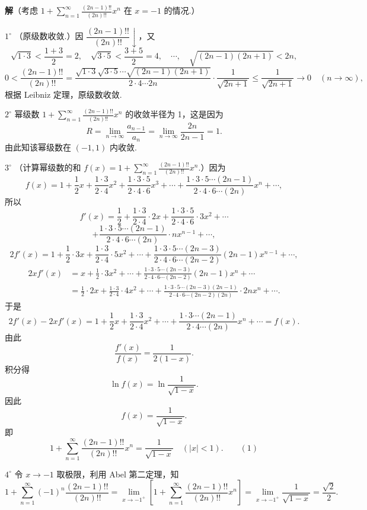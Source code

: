 \documentclass[UTF8, 12pt, fontset=fandol, oneside]{ctexart}
\begin{document}
\noindent\textbf{解}\quad （考虑 $\displaystyle 1+\sum_{n=1}^{\infty}\frac{(2n-1)!!}{(2n)!!}x^n$ 在 $x=-1$ 的情况.）

$1^\circ$ （原级数收敛.）因 $\dfrac{(2n-1)!!}{(2n)!!}\downarrow$，又
\[
  \sqrt{1\cdot3}<\frac{1+3}{2}=2,\quad
  \sqrt{3\cdot5}<\frac{3+5}{2}=4,\quad\cdots,\quad
  \sqrt{(2n-1)(2n+1)}<2n,
\]
\[
  0<\frac{(2n-1)!!}{(2n)!!}
  =\frac{\sqrt{1\cdot3}\sqrt{3\cdot5}\cdots\sqrt{(2n-1)(2n+1)}}{2\cdot4\cdots2n}\cdot\frac1{\sqrt{2n+1}}
  \le\frac1{\sqrt{2n+1}}\to0\quad(n\to\infty),
\]
根据 Leibniz 定理，原级数收敛.

$2^\circ$ 幂级数 $\displaystyle 1+\sum_{n=1}^{\infty}\frac{(2n-1)!!}{(2n)!!}x^n$ 的收敛半径为 1，这是因为
\[
  R=\lim_{n\to\infty}\frac{a_{n-1}}{a_n}
  =\lim_{n\to\infty}\frac{2n}{2n-1}=1.
\]
由此知该幂级数在 $(-1,1)$ 内收敛.

$3^\circ$ （计算幂级数的和
$\displaystyle f(x)=1+\sum_{n=1}^{\infty}\frac{(2n-1)!!}{(2n)!!}x^n$.）因为
\[
  f(x)=1+\frac12x+\frac{1\cdot3}{2\cdot4}x^2
  +\frac{1\cdot3\cdot5}{2\cdot4\cdot6}x^3+\cdots
  +\frac{1\cdot3\cdot5\cdots(2n-1)}{2\cdot4\cdot6\cdots(2n)}x^n+\cdots,
\]
所以
\[
  f'(x)=\frac12+\frac{1\cdot3}{2\cdot4}\cdot2x
  +\frac{1\cdot3\cdot5}{2\cdot4\cdot6}\cdot3x^2+\cdots
\]
\[
  +\frac{1\cdot3\cdot5\cdots(2n-1)}{2\cdot4\cdot6\cdots(2n)}\cdot nx^{n-1}+\cdots,
\]
\[
  2f'(x)=1+\frac12\cdot3x+\frac{1\cdot3}{2\cdot4}\cdot5x^2+\cdots
  +\frac{1\cdot3\cdot5\cdots(2n-3)}{2\cdot4\cdot6\cdots(2n-2)}(2n-1)x^{n-1}+\cdots,
\]
\[
\begin{aligned}
2xf'(x)&=x+\frac12\cdot3x^2+\cdots
+\frac{1\cdot3\cdot5\cdots(2n-3)}{2\cdot4\cdot6\cdots(2n-2)}(2n-1)x^n+\cdots\\
&=\frac12\cdot2x+\frac{1\cdot3}{2\cdot4}\cdot4x^2+\cdots
+\frac{1\cdot3\cdot5\cdots(2n-3)(2n-1)}{2\cdot4\cdot6\cdots(2n-2)(2n)}\cdot2nx^n+\cdots.
\end{aligned}
\]
于是
\[
  2f'(x)-2xf'(x)=1+\frac12x+\frac{1\cdot3}{2\cdot4}x^2+\cdots
  +\frac{1\cdot3\cdots(2n-1)}{2\cdot4\cdots(2n)}x^n+\cdots=f(x).
\]
由此
\[
  \frac{f'(x)}{f(x)}=\frac1{2(1-x)}.
\]
积分得
\[
  \ln f(x)=\ln\frac1{\sqrt{1-x}}.
\]
因此
\[
  f(x)=\frac1{\sqrt{1-x}}.
\]
即
\[
  1+\sum_{n=1}^{\infty}\frac{(2n-1)!!}{(2n)!!}x^n=\frac1{\sqrt{1-x}}\quad(|x|<1). \qquad(1)
\]

$4^\circ$ 令 $x\to-1$ 取极限，利用 Abel 第二定理，知
\[
  1+\sum_{n=1}^{\infty}(-1)^n\frac{(2n-1)!!}{(2n)!!}
  =\lim_{x\to-1^+}\left[1+\sum_{n=1}^{\infty}\frac{(2n-1)!!}{(2n)!!}x^n\right]
  =\lim_{x\to-1^+}\frac1{\sqrt{1-x}}=\frac{\sqrt2}{2}.
\]
\end{document}

